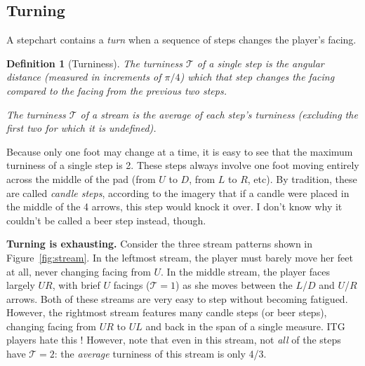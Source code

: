 \documentclass[10pt]{sigplanconf}
\begin{document}
\subsection{Turning}

A stepchart contains a {\em turn} when a sequence of steps changes the player's facing.

\newtheorem{definition}{Definition}
\begin{definition}[Turniness]
	The turniness $\mathcal{T}$ of a single step is the angular distance (measured in increments of $\pi/4$) which that step changes the facing compared to the facing from the previous two steps.

	The turniness $\mathcal{T}$ of a stream is the average of each step's turniness (excluding the first two for which it is undefined).
\end{definition}

Because only one foot may change at a time, it is easy to see that the maximum turniness of a single step is 2.
These steps always involve one foot moving entirely across the middle of the pad (from $U$ to $D$, from $L$ to $R$, etc).
By tradition, these are called {\em candle steps}, according to the imagery that if a candle were placed in the middle of the 4 arrows, this step would knock it over. I don't know why it couldn't be called a beer step instead, though.

{\bf Turning is exhausting.} Consider the three stream patterns shown in Figure~\ref{fig:stream}.
In the leftmost stream, the player must barely move her feet at all, never changing facing from $U$.
In the middle stream, the player faces largely $UR$, with brief $U$ facings ($\mathcal{T}=1$) as she moves between the $L$/$D$ and $U$/$R$ arrows.
Both of these streams are very easy to step without becoming fatigued.
However, the rightmost stream features many candle steps (or beer steps), changing facing from $UR$ to $UL$ and back in the span of a single measure.
ITG players hate this \cite{weirdtrick}!
However, note that even in this stream, not {\em all} of the steps have $\mathcal{T}=2$: the {\em average} turniness of this stream is only 4/3.
\end{document}
